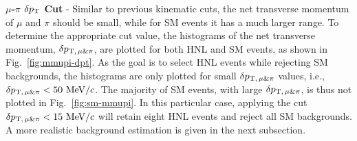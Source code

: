         \textbf{$\mu$-$\pi$ $\delta p_\textrm{T}$ Cut} - Similar to previous kinematic cuts, the net transverse momentum of $\mu$ and $\pi$ should be small, while for SM events it has a much larger range.
        To determine the appropriate cut value, the histograms of the net transverse momentum, $\delta p_{\textrm{T},\,\mu\&\pi}$, are plotted for both HNL and SM events, as shown in Fig.~\ref{fig:mmupi-dpt}.
        As the goal is to select HNL events while rejecting SM backgrounds, the histograms are only plotted for small $\delta p_{\textrm{T},\,\mu\&\pi}$ values, i.e., $\delta p_{\textrm{T},\,\mu\&\pi}<50~\textrm{MeV}/c$. 
        The majority of SM events, with large $\delta p_{\textrm{T},\,\mu\&\pi}$, is thus not plotted in Fig.~\ref{fig:sm-mmupi}.
        In this particular case, applying the cut $\delta p_{\textrm{T},\,\mu\&\pi}<15~\textrm{MeV}/c$ will retain eight HNL events and reject all SM backgrounds.
        A more realistic background estimation is given in the next subsection.

